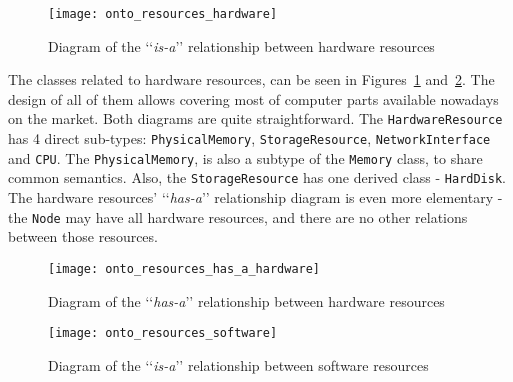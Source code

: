 \begin{figure}[ht]
\centering
\texttt{[image: onto\_resources\_hardware]}
\caption{Diagram of the \lq\lq{}\emph{is-a}\rq\rq{} relationship between hardware resources}
\label{fig:onto_resources_hardware}
\end{figure}

The classes related to hardware resources, can be seen in Figures~\ref{fig:onto_resources_hardware} and~\ref{fig:onto_resources_has_a_hardware}. The design of all of them allows covering most of computer parts available nowadays on the market. Both diagrams are quite straightforward. The \texttt{HardwareResource} has 4 direct sub-types: \texttt{PhysicalMemory}, \texttt{StorageResource}, \texttt{NetworkInterface} and \texttt{CPU}. The \texttt{PhysicalMemory}, is also a subtype of the \texttt{Memory} class, to share common semantics. Also, the \texttt{StorageResource} has one derived class - \texttt{HardDisk}. The hardware resources\rq{} \lq\lq{}\emph{has-a}\rq\rq{} relationship diagram is even more elementary - the \texttt{Node} may have all hardware resources, and there are no other relations between those resources.

\begin{figure}[ht]
\centering
\texttt{[image: onto\_resources\_has\_a\_hardware]}
\caption{Diagram of the \lq\lq{}\emph{has-a}\rq\rq{} relationship between hardware resources}
\label{fig:onto_resources_has_a_hardware}
\end{figure}

\begin{figure}[ht]
\centering
\texttt{[image: onto\_resources\_software]}
\caption{Diagram of the \lq\lq{}\emph{is-a}\rq\rq{} relationship between software resources}
\label{fig:onto_resources_software}
\end{figure}

